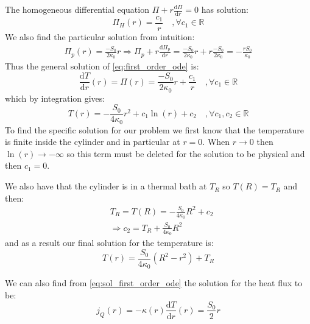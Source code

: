 The homogeneous differential equation $\Pi + r\frac{\mathrm{d}\Pi}{\mathrm{d}r} = 0$ has solution:
\begin{equation}
    \Pi_H(r) = \frac{c_1}{r} \quad, \forall c_1\in\mathbb{R}
\end{equation}
We also find the particular solution from intuition:
\begin{equation}
    \begin{aligned}
        \Pi_p(r) = \frac{-S_0}{2\kappa_0}r
        \Rightarrow \Pi_p + r\frac{\mathrm{d}\Pi_p}{\mathrm{d}r} = \frac{-S_0}{2\kappa_0}r + r\frac{-S_0}{2\kappa_0} = -\frac{rS_0}{\kappa_0}
    \end{aligned}
\end{equation}
Thus the general solution of \autoref{eq:first_order_ode} is:
\begin{equation}
    \frac{\mathrm{d}T}{\mathrm{d}r}(r) = \Pi(r) = \frac{-S_0}{2\kappa_0}r + \frac{c_1}{r} \quad, \forall c_1\in\mathbb{R}
    \label{eq:sol_first_order_ode}
\end{equation}
which by integration gives:
\begin{equation}
    T(r) = -\frac{S_0}{4\kappa_0}r^2 + c_1\ln(r) + c_2 \quad, \forall c_1, c_2\in\mathbb{R}
\end{equation}
To find the specific solution for our problem we first know that the temperature is finite inside the cylinder and in particular at $r=0$. When $r\to0$ then $\ln(r)\to-\infty$ so this term must be deleted for the solution to be physical and then $c_1=0$.

We also have that the cylinder is in a thermal bath at $T_R$ so $T(R) = T_R$ and then:
\begin{equation}
    \begin{aligned}
        & T_R = T(R) = -\frac{S_0}{4\kappa_0}R^2 + c_2 \\
        & \Rightarrow c_2 = T_R + \frac{S_0}{4\kappa_0}R^2
    \end{aligned}
\end{equation}
and as a result our final solution for the temperature is:
\begin{equation}
    T(r) = \frac{S_0}{4\kappa_0}(R^2 - r^2) + T_R
    \label{eq:analytical_solution_T}
\end{equation}

We can also find from \autoref{eq:sol_first_order_ode} the solution for the heat flux to be:
\begin{equation}
    j_Q(r) = -\kappa(r)\frac{\mathrm{d}T}{\mathrm{d}r}(r) = \frac{S_0}{2}r
\end{equation}
